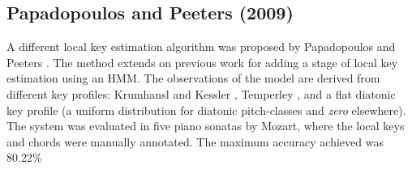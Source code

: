 

\subsection{Papadopoulos and Peeters (2009)}

A different local key estimation algorithm was proposed by Papadopoulos and Peeters \cite{papadopoulos_local_2009}. The method extends on previous work \cite{papadopoulos_simultaneous_2008} for adding a stage of local key estimation using an HMM. The observations of the model are derived from different key profiles: Krumhansl and Kessler \cite{krumhansl_tracing_1982}, Temperley \cite{temperley_whats_1999}, and a flat diatonic key profile (a uniform distribution for diatonic pitch-classes and \emph{zero} elsewhere). The system was evaluated in five piano sonatas by Mozart, where the local keys and chords were manually annotated. The maximum accuracy achieved was 80.22\%

